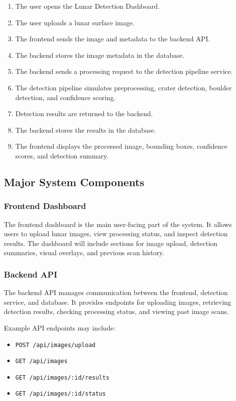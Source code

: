 \documentclass[12pt]{article}
\begin{document}
\begin{enumerate}
    \item The user opens the Lunar Detection Dashboard.
    \item The user uploads a lunar surface image.
    \item The frontend sends the image and metadata to the backend API.
    \item The backend stores the image metadata in the database.
    \item The backend sends a processing request to the detection pipeline service.
    \item The detection pipeline simulates preprocessing, crater detection, boulder detection, and confidence scoring.
    \item Detection results are returned to the backend.
    \item The backend stores the results in the database.
    \item The frontend displays the processed image, bounding boxes, confidence scores, and detection summary.
\end{enumerate}

\subsection{Major System Components}

\subsubsection{Frontend Dashboard}

The frontend dashboard is the main user-facing part of the system. It allows users to upload lunar images, view processing status, and inspect detection results. The dashboard will include sections for image upload, detection summaries, visual overlays, and previous scan history.

\subsubsection{Backend API}

The backend API manages communication between the frontend, detection service, and database. It provides endpoints for uploading images, retrieving detection results, checking processing status, and viewing past image scans.

Example API endpoints may include:

\begin{itemize}
    \item \texttt{POST /api/images/upload}
    \item \texttt{GET /api/images}
    \item \texttt{GET /api/images/:id/results}
    \item \texttt{GET /api/images/:id/status}
\end{itemize}
\end{document}
